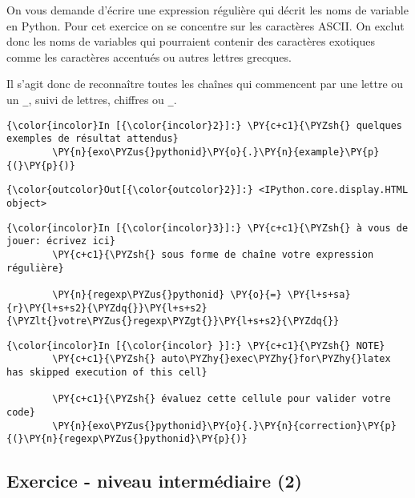     On vous demande d'écrire une expression régulière qui décrit les noms de
variable en Python. Pour cet exercice on se concentre sur les caractères
ASCII. On exclut donc les noms de variables qui pourraient contenir des
caractères exotiques comme les caractères accentués ou autres lettres
grecques.

Il s'agit donc de reconnaître toutes les chaînes qui commencent par une
lettre ou un \texttt{\_}, suivi de lettres, chiffres ou \texttt{\_}.

    \begin{Verbatim}[commandchars=\\\{\}]
{\color{incolor}In [{\color{incolor}2}]:} \PY{c+c1}{\PYZsh{} quelques exemples de résultat attendus}
        \PY{n}{exo\PYZus{}pythonid}\PY{o}{.}\PY{n}{example}\PY{p}{(}\PY{p}{)}
\end{Verbatim}


\begin{Verbatim}[commandchars=\\\{\}]
{\color{outcolor}Out[{\color{outcolor}2}]:} <IPython.core.display.HTML object>
\end{Verbatim}
            
    \begin{Verbatim}[commandchars=\\\{\}]
{\color{incolor}In [{\color{incolor}3}]:} \PY{c+c1}{\PYZsh{} à vous de jouer: écrivez ici}
        \PY{c+c1}{\PYZsh{} sous forme de chaîne votre expression régulière}
        
        \PY{n}{regexp\PYZus{}pythonid} \PY{o}{=} \PY{l+s+sa}{r}\PY{l+s+s2}{\PYZdq{}}\PY{l+s+s2}{\PYZlt{}votre\PYZus{}regexp\PYZgt{}}\PY{l+s+s2}{\PYZdq{}}
\end{Verbatim}


    \begin{Verbatim}[commandchars=\\\{\}]
{\color{incolor}In [{\color{incolor} }]:} \PY{c+c1}{\PYZsh{} NOTE}
        \PY{c+c1}{\PYZsh{} auto\PYZhy{}exec\PYZhy{}for\PYZhy{}latex has skipped execution of this cell}
        
        \PY{c+c1}{\PYZsh{} évaluez cette cellule pour valider votre code}
        \PY{n}{exo\PYZus{}pythonid}\PY{o}{.}\PY{n}{correction}\PY{p}{(}\PY{n}{regexp\PYZus{}pythonid}\PY{p}{)}
\end{Verbatim}


    \hypertarget{exercice---niveau-intermuxe9diaire-2}{%
\subsection{Exercice - niveau intermédiaire
(2)}\label{exercice---niveau-intermuxe9diaire-2}}

